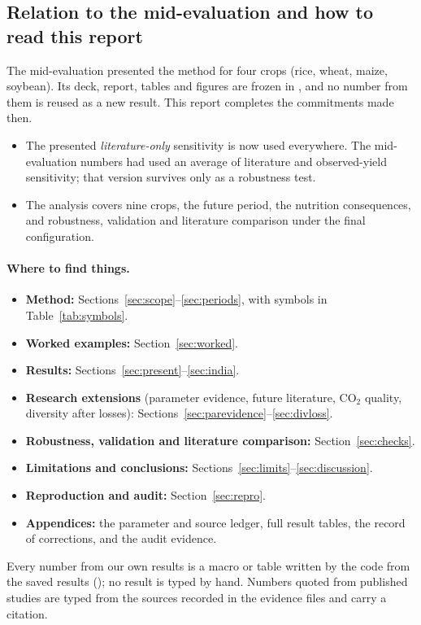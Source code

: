 \subsection{Relation to the mid-evaluation and how to read this report}
The mid-evaluation presented the method for four crops (rice, wheat, maize, soybean). Its deck, report, tables
and figures are frozen in , and no number from them is reused as a new result.
This report completes the commitments made then.
\begin{itemize}
\item The presented \emph{literature-only} sensitivity is now used everywhere. The mid-evaluation numbers had
used an average of literature and observed-yield sensitivity; that version survives only as a robustness test.
\item The analysis covers nine crops, the future period, the nutrition consequences, and robustness,
validation and literature comparison under the final configuration.
\end{itemize}

\paragraph{Where to find things.}
\begin{itemize}
\item \textbf{Method:} Sections~\ref{sec:scope}--\ref{sec:periods}, with symbols in Table~\ref{tab:symbols}.
\item \textbf{Worked examples:} Section~\ref{sec:worked}.
\item \textbf{Results:} Sections~\ref{sec:present}--\ref{sec:india}.
\item \textbf{Research extensions} (parameter evidence, future literature, CO$_2$ quality, diversity after losses):
Sections~\ref{sec:parevidence}--\ref{sec:divloss}.
\item \textbf{Robustness, validation and literature comparison:} Section~\ref{sec:checks}.
\item \textbf{Limitations and conclusions:} Sections~\ref{sec:limits}--\ref{sec:discussion}.
\item \textbf{Reproduction and audit:} Section~\ref{sec:repro}.
\item \textbf{Appendices:} the parameter and source ledger, full result tables, the record of corrections, and
the audit evidence.
\end{itemize}

Every number from our own results is a macro or table written by the code from the saved results
(); no result is typed by hand. Numbers quoted from published studies are typed
from the sources recorded in the evidence files and carry a citation.
